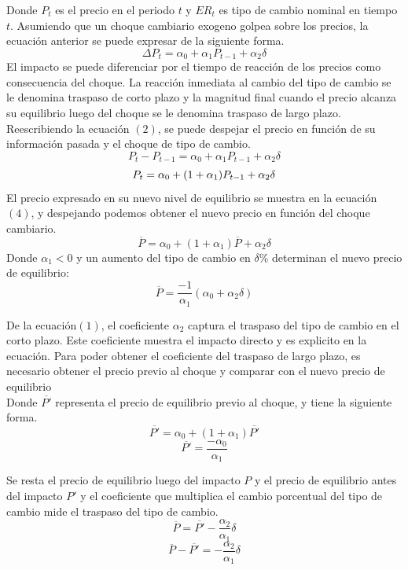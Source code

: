 \documentclass[12pt,a4paper,pdflatex]{article}
\begin{document}
Donde $P_{t}$ es el precio en el periodo $t$ y $ER_{t}$ es tipo de cambio nominal en tiempo $t$. Asumiendo que un choque cambiario exogeno golpea sobre los precios, la ecuación anterior se puede expresar de la siguiente forma.
\begin{equation}
  \Delta P_{t} = \alpha_{0} +\alpha_{1}P_{t-1} +\alpha_{2}\delta
\end{equation}
El impacto se puede diferenciar por el tiempo de reacción de los precios como consecuencia del choque. La reacción inmediata al cambio del tipo de cambio se le denomina traspaso de corto plazo y la magnitud final cuando el precio alcanza su equilibrio luego del choque se le denomina traspaso de largo plazo. \\
Reescribiendo la ecuación $(2)$, se puede despejar el precio en función de su información pasada y el choque de tipo de cambio.
 $$P_{t}- P_{t-1} = \alpha_{0} +\alpha_{1}P_{t-1} +\alpha_{2}\delta$$
\begin{equation}
 P_{t} = \alpha_{0} + (1+\alpha_{1})P_{t-1} + \alpha_{2}\delta \\
 \end{equation}
 El precio expresado en su nuevo nivel de equilibrio se muestra en la ecuación $(4)$, y despejando podemos obtener el nuevo precio en función del choque cambiario.
 \begin{equation}
 \overline{P} =  \alpha_{0} + (1+\alpha_{1})\overline{P}+ \alpha_{2}\delta
\end{equation}
Donde $\alpha_{1}<0$ y un aumento del tipo de cambio en $\delta \%$ determinan el nuevo precio de equilibrio:
$$\overline{P} = \frac{-1}{\alpha_{1}}(\alpha_{0}+\alpha_{2}\delta)$$

De la ecuación$(1)$, el coeficiente $\alpha_{2}$ captura el traspaso del tipo de cambio en el corto plazo. Este coeficiente muestra el impacto directo y es explicito en la ecuación. Para poder obtener el coeficiente del traspaso de largo plazo, es necesario obtener el precio previo al choque y comparar con el nuevo precio de equilibrio \\
Donde $\overline{P'}$ representa el precio de equilibrio previo al choque, y tiene la siguiente forma.
\begin{equation}
 \overline{P'} = \alpha_{0} + (1+\alpha_{1})\overline{P'}
\end{equation}
$$\overline{P'} = \frac{-\alpha_{0}}{\alpha_{1}}$$

Se resta el precio de equilibrio luego del impacto $P$ y el precio de equilibrio antes del impacto $P'$ y el coeficiente que multiplica el cambio porcentual del tipo de cambio mide el traspaso del tipo de cambio.
\begin{equation}
 \overline{P} = \overline{P'} - \frac{\alpha_{2}}{\alpha_{1}}\delta
\end{equation}
$$\overline{P} - \overline{P'} = -\frac{\alpha_{2}}{\alpha_{1}}\delta$$
\end{document}
